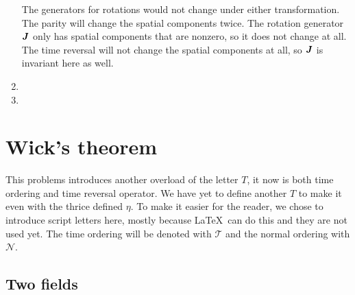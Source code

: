\documentclass[11pt, english, fleqn, DIV=15, headinclude, BCOR=1cm]{scrartcl}
\begin{document}
\begin{enumerate}
        The generators for rotations would not change under either
        transformation. The parity will change the spatial components twice.
        The rotation generator $\mat J$ only has spatial components that are
        nonzero, so it does not change at all. The time reversal will not
        change the spatial components at all, so $\mat J$ is invariant here as
        well. 

    \item

    \item
\end{enumerate}

\section{Wick's theorem}
\label{homework:2}

\newcommand\timeorder{\mathscr T}
\newcommand\normorder{\mathscr N}

This problems introduces another overload of the letter $T$, it now is both
time ordering and time reversal operator. We have yet to define another $T$ to
make it even with the thrice defined $\eta$. To make it easier for the reader,
we chose to introduce script letters here, mostly because \LaTeX\ can do this
and they are not used yet. The time ordering will be denoted with $\timeorder$
and the normal ordering with $\normorder$.

\subsection{Two fields}
\end{document}
